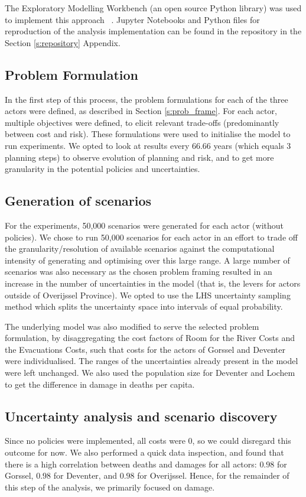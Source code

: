 The Exploratory Modelling Workbench (an open source Python library) was used to implement this approach ~\parencite{kwakkel_exploratory_2017}. Jupyter Notebooks and Python files for reproduction of the analysis implementation can be found in the repository in the Section \ref{s:repository} Appendix.

\subsection{Problem Formulation}
In the first step of this process, the problem formulations for each of the three actors were defined, as described in Section \ref{s:prob_frame}. For each actor, multiple objectives were defined, to elicit relevant trade-offs (predominantly between cost and risk). These formulations were used to initialise the model to run experiments. We opted to look at results every $66.66$ years (which equals 3 planning steps) to observe evolution of planning and risk, and to get more granularity in the potential policies and uncertainties.

\subsection{Generation of scenarios}
For the experiments, 50,000 scenarios were generated for each actor (without policies). We chose to run 50,000 scenarios for each actor in an effort to trade off the granularity/resolution of available scenarios against the computational intensity of generating and optimising over this large range. A large number of scenarios was also necessary as the chosen problem framing resulted in an increase in the number of uncertainties in the model (that is, the levers for actors outside of Overijssel Province). We opted to use the LHS uncertainty sampling method which splits the uncertainty space into intervals of equal probability.

The underlying model was also modified to serve the selected problem formulation, by disaggregating the cost factors of Room for the River Costs and the Evacuations Costs, such that costs for the actors of Gorssel and Deventer were individualised. The ranges of the uncertainties already present in the model were left unchanged. We also used the population size for Deventer and Lochem to get the difference in damage in deaths per capita. 


\subsection{Uncertainty analysis and scenario discovery}
Since no policies were implemented, all costs were 0, so we could disregard this outcome for now. We also performed a quick data inspection, and found that there is a high correlation between deaths and damages for all actors: $0.98$ for Gorssel, $0.98$ for Deventer, and $0.98$ for Overijssel. Hence, for the remainder of this step of the analysis, we primarily focused on damage.

